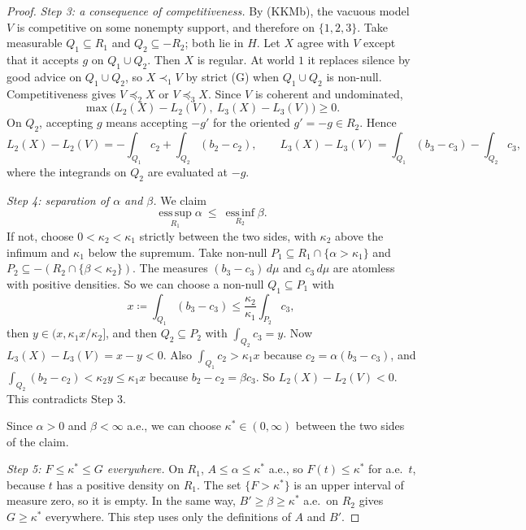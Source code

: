 \documentclass[11pt]{article}
\theoremstyle{remark}\newtheorem{remark}[theorem]{Remark}
\begin{document}
\begin{proof}
\emph{Step 3: a consequence of competitiveness.} By (KKMb), the vacuous model
$V$ is competitive on some nonempty support, and therefore on $\{1,2,3\}$.
Take measurable $Q_1\subseteq R_1$ and $Q_2\subseteq-R_2$; both lie in $H$.
Let $X$ agree with $V$ except that it accepts $g$ on $Q_1\cup Q_2$. Then $X$ is
regular. At world $1$ it replaces silence by good advice on $Q_1\cup Q_2$, so
$X\prec_1V$ by strict (G) when $Q_1\cup Q_2$ is non-null. Competitiveness gives
$V\preceq_2X$ or $V\preceq_3X$. Since $V$ is coherent and undominated,
\[
 \max\bigl(L_2(X)-L_2(V),\ L_3(X)-L_3(V)\bigr)\ge0.
\]
On $Q_2$, accepting $g$ means accepting $-g'$ for the oriented $g'=-g\in R_2$.
Hence
\[
 L_2(X)-L_2(V)=-\int_{Q_1}c_2+\int_{Q_2}(b_2-c_2),\qquad
 L_3(X)-L_3(V)=\int_{Q_1}(b_3-c_3)-\int_{Q_2}c_3,
\]
where the integrands on $Q_2$ are evaluated at $-g$.

\emph{Step 4: separation of $\alpha$ and $\beta$.} We claim
\[
 \operatorname*{ess\,sup}_{R_1}\alpha\ \le\ \operatorname*{ess\,inf}_{R_2}\beta.
\]
If not, choose $0<\kappa_2<\kappa_1$ strictly between the two sides, with
$\kappa_2$ above the infimum and $\kappa_1$ below the supremum. Take non-null
$P_1\subseteq R_1\cap\{\alpha>\kappa_1\}$ and
$P_2\subseteq-(R_2\cap\{\beta<\kappa_2\})$. The measures $(b_3-c_3)\,d\mu$ and
$c_3\,d\mu$ are atomless with positive densities. So we can choose a non-null
$Q_1\subseteq P_1$ with
\[
 x\coloneqq\int_{Q_1}(b_3-c_3)\le\frac{\kappa_2}{\kappa_1}\int_{P_2}c_3,
\]
then $y\in(x,\kappa_1x/\kappa_2]$, and then $Q_2\subseteq P_2$ with
$\int_{Q_2}c_3=y$. Now $L_3(X)-L_3(V)=x-y<0$. Also
$\int_{Q_1}c_2>\kappa_1x$ because $c_2=\alpha(b_3-c_3)$, and
$\int_{Q_2}(b_2-c_2)<\kappa_2y\le\kappa_1x$ because $b_2-c_2=\beta c_3$. So
$L_2(X)-L_2(V)<0$. This contradicts Step 3.

Since $\alpha>0$ and $\beta<\infty$ a.e., we can choose $\kappa^*\in(0,\infty)$
between the two sides of the claim.

\emph{Step 5: $F\le\kappa^*\le G$ everywhere.} On $R_1$, $A\le\alpha\le\kappa^*$
a.e., so $F(t)\le\kappa^*$ for a.e.\ $t$, because $t$ has a positive density
on $R_1$. The set $\{F>\kappa^*\}$ is an upper interval of measure zero, so it
is empty. In the same way, $B'\ge\beta\ge\kappa^*$ a.e.\ on $R_2$ gives
$G\ge\kappa^*$ everywhere. This step uses only the definitions of $A$ and $B'$.


\end{proof}
\end{document}

